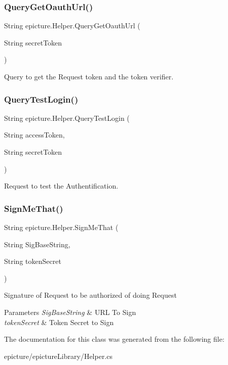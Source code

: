\subsubsection{\texorpdfstring{Query\+Get\+Oauth\+Url()}{QueryGetOauthUrl()}}
{\footnotesize\ttfamily String epicture.\+Helper.\+Query\+Get\+Oauth\+Url (\begin{DoxyParamCaption}\item[{String}]{secret\+Token }\end{DoxyParamCaption})}

Query to get the Request token and the token verifier. \mbox{\label{classepicture_1_1_helper_ab01acef7d30c0270753f5deb838b993e}} 
\subsubsection{\texorpdfstring{Query\+Test\+Login()}{QueryTestLogin()}}
{\footnotesize\ttfamily String epicture.\+Helper.\+Query\+Test\+Login (\begin{DoxyParamCaption}\item[{String}]{access\+Token,  }\item[{String}]{secret\+Token }\end{DoxyParamCaption})}

Request to test the Authentification. \mbox{\label{classepicture_1_1_helper_a4ef537048b54f85c7f3e1a4c400e0b10}} 
\subsubsection{\texorpdfstring{Sign\+Me\+That()}{SignMeThat()}}
{\footnotesize\ttfamily String epicture.\+Helper.\+Sign\+Me\+That (\begin{DoxyParamCaption}\item[{String}]{Sig\+Base\+String,  }\item[{String}]{token\+Secret }\end{DoxyParamCaption})}

Signature of Request to be authorized of doing Request 
\begin{DoxyParams}{Parameters}
{\em Sig\+Base\+String} & U\+RL To Sign \\
\hline
{\em token\+Secret} & Token Secret to Sign \\
\hline
\end{DoxyParams}


The documentation for this class was generated from the following file\+:\begin{DoxyCompactItemize}
\item 
epicture/epicture\+Library/Helper.\+cs\end{DoxyCompactItemize}
